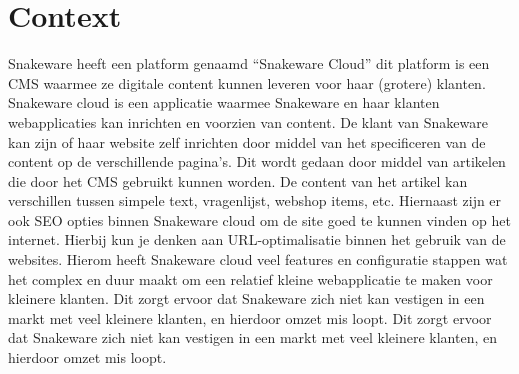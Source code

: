 \section{Context}
Snakeware heeft een platform genaamd “Snakeware Cloud” dit platform is een \gls{CMS} waarmee ze digitale content kunnen leveren voor haar (grotere) klanten.
Snakeware cloud is een applicatie waarmee Snakeware en haar klanten webapplicaties kan inrichten en voorzien van content.%
\whitespace
De klant van Snakeware kan zijn of haar website zelf inrichten door middel van het specificeren van de content op de verschillende pagina's.
Dit wordt gedaan door middel van artikelen die door het \gls{CMS} gebruikt kunnen worden.
De content van het artikel kan verschillen tussen simpele text, vragenlijst, webshop items, etc.
Hiernaast zijn er ook \gls{SEO} opties binnen Snakeware cloud om de site goed te kunnen vinden op het internet.
Hierbij kun je denken aan URL-optimalisatie binnen het gebruik van de websites.
Hierom heeft Snakeware cloud veel features en configuratie stappen wat het complex en duur maakt om een relatief kleine webapplicatie te maken voor kleinere klanten.
\whitespace
Dit zorgt ervoor dat Snakeware zich niet kan vestigen in een markt met veel kleinere klanten,
en hierdoor omzet mis loopt.
Dit zorgt ervoor dat Snakeware zich niet kan vestigen in een markt met veel kleinere klanten, en hierdoor omzet mis loopt.
